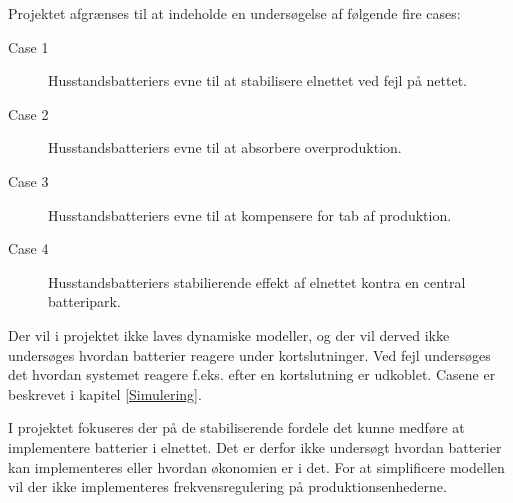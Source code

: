 
\label{Afgraensning}

Projektet afgrænses til at indeholde en undersøgelse af følgende fire cases:

\begin{description}
	\item[Case 1] Husstandsbatteriers evne til at stabilisere elnettet ved fejl på nettet.
	\item[Case 2] Husstandsbatteriers evne til at absorbere overproduktion.
	\item[Case 3] Husstandsbatteriers evne til at kompensere for tab af produktion.
	\item[Case 4] Husstandsbatteriers stabilierende effekt af elnettet kontra en central batteripark.
\end{description}	
	
Der vil i projektet ikke laves dynamiske modeller, og der vil derved ikke undersøges hvordan batterier reagere under kortslutninger. Ved fejl undersøges det hvordan systemet reagere f.eks. efter en kortslutning er udkoblet. Casene er beskrevet i kapitel \ref{Simulering}.  
 

I projektet fokuseres der på de stabiliserende fordele det kunne medføre at implementere batterier i elnettet. Det er derfor ikke undersøgt hvordan batterier kan implementeres eller hvordan økonomien er i det. For at simplificere modellen vil der ikke implementeres frekvensregulering på produktionsenhederne.
